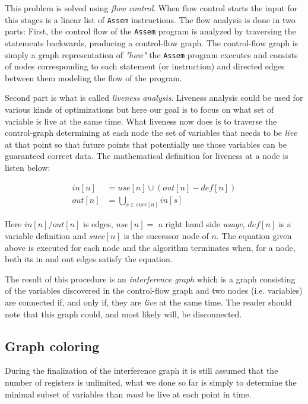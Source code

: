 \documentclass[11pt]{amsart}
\begin{document}
This problem is solved using \textit{flow control}. When flow control starts the input for this stages is a linear list of \texttt{Assem} instructions. The flow analysis is done in two parts: First, the control flow of the \texttt{Assem} program is analyzed by traversing the statements backwards, producing a control-flow graph. The control-flow graph is simply a graph representation of \textit{"how"} the \texttt{Assem} program executes and consists of nodes corresponding to each statement (or instruction) and directed edges between them modeling the flow of the program.

Second part is what is called \textit{liveness analysis}. Liveness analysis could be used for various kinds of optimizations but here our goal is to focus on what set of variable is live at the same time. What liveness now does is to traverse the control-graph determining at each node the set of variables that needs to be \textit{live} at that point so that future points that potentially use those variables can be guaranteed correct data. The mathematical definition for liveness at a node is listen below:

\begin{align*}
in[n] &= use[n] \cup (out[n] - def[n]) \\
out[n] &= \bigcup_{s \in succ[n]} in[s]
\end{align*}

Here $in[n]/out[n]$ is edges, $use[n] =$ a right hand side \textit{usage}, $def[n]$ is a variable definition and $succ[n]$ is the successor node of $n$. The equation given above is executed for each node and the algorithm terminates when, for a node, both its in and out edges satisfy the equation. 

The result of this procedure is an \textit{interference graph} which is a graph consisting of the variables discovered in the control-flow graph and two nodes (i.e. variables) are connected if, and only if, they are \textit{live} at the same time. The reader should note that this graph could, and most likely will, be disconnected.

\subsection{Graph coloring}
During the finalization of the interference graph it is still assumed that the number of registers is unlimited, what we done so far is simply to determine the minimal subset of variables than \textit{must} be live at each point in time.
\end{document}

